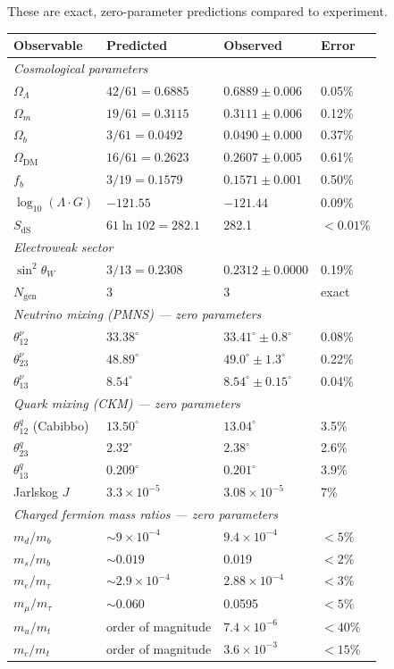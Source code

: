 \documentclass[11pt]{article}
\begin{document}
These are exact, zero-parameter predictions compared to experiment.

\smallskip
\begin{center}
\small
\begin{tabular}{llll}
\toprule
\textbf{Observable} & \textbf{Predicted} & \textbf{Observed} & \textbf{Error} \\
\midrule
\multicolumn{4}{l}{\textit{Cosmological parameters}} \\
$\Omega_\Lambda$ & $42/61 = 0.6885$ & $0.6889 \pm 0.006$ & 0.05\% \\
$\Omega_m$ & $19/61 = 0.3115$ & $0.3111 \pm 0.006$ & 0.12\% \\
$\Omega_b$ & $3/61 = 0.0492$ & $0.0490 \pm 0.000$ & 0.37\% \\
$\Omega_{\mathrm{DM}}$ & $16/61 = 0.2623$ & $0.2607 \pm 0.005$ & 0.61\% \\
$f_b$ & $3/19 = 0.1579$ & $0.1571 \pm 0.001$ & 0.50\% \\
$\log_{10}(\Lambda\!\cdot\! G)$ & $-121.55$ & $-121.44$ & 0.09\% \\
$S_{\mathrm{dS}}$ & $61\ln 102 = 282.1$ & 282.1 & ${<}0.01$\% \\[4pt]
\multicolumn{4}{l}{\textit{Electroweak sector}} \\
$\sin^2\!\theta_W$ & $3/13 = 0.2308$ & $0.2312 \pm 0.0000$ & 0.19\% \\
$N_{\mathrm{gen}}$ & 3 & 3 & exact \\[4pt]
\multicolumn{4}{l}{\textit{Neutrino mixing (PMNS) --- zero parameters}} \\
$\theta_{12}^\nu$ & $33.38^\circ$ & $33.41^\circ \pm 0.8^\circ$ & 0.08\% \\
$\theta_{23}^\nu$ & $48.89^\circ$ & $49.0^\circ \pm 1.3^\circ$ & 0.22\% \\
$\theta_{13}^\nu$ & $8.54^\circ$ & $8.54^\circ \pm 0.15^\circ$ & 0.04\% \\[4pt]
\multicolumn{4}{l}{\textit{Quark mixing (CKM) --- zero parameters}} \\
$\theta_{12}^q$ (Cabibbo) & $13.50^\circ$ & $13.04^\circ$ & 3.5\% \\
$\theta_{23}^q$ & $2.32^\circ$ & $2.38^\circ$ & 2.6\% \\
$\theta_{13}^q$ & $0.209^\circ$ & $0.201^\circ$ & 3.9\% \\
Jarlskog $J$ & $3.3\times 10^{-5}$ & $3.08\times 10^{-5}$ & 7\% \\[4pt]
\multicolumn{4}{l}{\textit{Charged fermion mass ratios --- zero parameters}} \\
$m_d/m_b$ & $\sim\! 9\times 10^{-4}$ & $9.4\times 10^{-4}$ & ${<}5$\% \\
$m_s/m_b$ & $\sim\! 0.019$ & 0.019 & ${<}2$\% \\
$m_e/m_\tau$ & $\sim\! 2.9\times 10^{-4}$ & $2.88\times 10^{-4}$ & ${<}3$\% \\
$m_\mu/m_\tau$ & $\sim\! 0.060$ & 0.0595 & ${<}5$\% \\
$m_u/m_t$ & order of magnitude & $7.4\times 10^{-6}$ & ${<}40$\% \\
$m_c/m_t$ & order of magnitude & $3.6\times 10^{-3}$ & ${<}15$\% \\
\bottomrule
\end{tabular}
\end{center}
\end{document}

